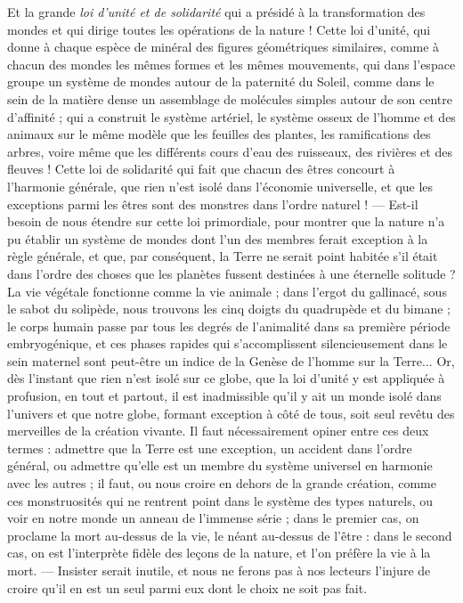 \documentclass[a4paper, 11pt, oneside]{article}
\begin{document}
Et la grande \emph{loi d'unité et de solidarité} qui a présidé à la transformation des mondes et qui dirige toutes les opérations de la nature ! Cette loi d'unité, qui donne à chaque espèce de minéral des figures géométriques similaires, comme à chacun des mondes les mêmes formes et les mêmes mouvements, qui dans l'espace groupe un système de mondes autour de la paternité du Soleil, comme dans le sein de la matière dense un assemblage de molécules simples autour de son centre d'affinité ; qui a construit le système artériel, le système osseux de l'homme et des animaux sur le même modèle que les feuilles des plantes, les ramifications des arbres, voire même que les différents cours d'eau des ruisseaux, des rivières et des fleuves ! Cette loi de solidarité qui fait que chacun des êtres concourt à l'harmonie générale, que rien n'est isolé dans l'économie universelle, et que les exceptions parmi les êtres sont des monstres dans l'ordre naturel ! --- Est-il besoin de nous étendre sur cette loi primordiale, pour montrer que la nature n'a pu établir un système de mondes dont l'un des membres ferait exception à la règle générale, et que, par conséquent, la Terre ne serait point habitée s'il était dans l'ordre des choses que les planètes fussent destinées à une éternelle solitude ? La vie végétale fonctionne comme la vie animale ; dans l'ergot du gallinacé, sous le sabot du solipède, nous trouvons les cinq doigts du quadrupède et du bimane ; le corps humain passe par tous les degrés de l'animalité dans sa première période embryogénique, et ces phases rapides qui s'accomplissent silencieusement dans le sein maternel sont peut-être un indice de la Genèse de l'homme sur la Terre... Or, dès l'instant que rien n'est isolé sur ce globe, que la loi d'unité y est appliquée à profusion, en tout et partout, il est inadmissible qu'il y ait un monde isolé dans l'univers et que notre globe, formant exception à côté de tous, soit seul revêtu des merveilles de la création vivante. Il faut nécessairement opiner entre ces deux termes : admettre que la Terre est une exception, un accident dans l'ordre général, ou admettre qu'elle est un membre du système universel en harmonie avec les autres ; il faut, ou nous croire en dehors de la grande création, comme ces monstruosités qui ne rentrent point dans le système des types naturels, ou voir en notre monde un anneau de l'immense série ; dans le premier cas, on proclame la mort au-dessus de la vie, le néant au-dessus de l'être : dans le second cas, on est l'interprète fidèle des leçons de la nature, et l'on préfère la vie à la mort. --- Insister serait inutile, et nous ne ferons pas à nos lecteurs l'injure de croire qu'il en est un seul parmi eux dont le choix ne soit pas fait.
\end{document}

